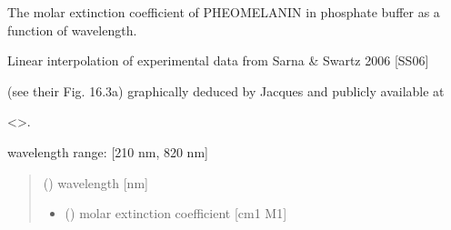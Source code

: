 \documentclass[letterpaper,10pt,english]{sphinxmanual}
\begin{document}
\begin{fulllineitems}
\label{\detokenize{03_absorption_coefficient:skinoptics.absorption_coefficient.molarext_phe_Sarna}}
\pysigstartsignatures
{}
\pysigstopsignatures
\begin{DUlineblock}{0em}
\item[] The molar extinction coefficient of PHEOMELANIN in phosphate buffer as a function of wavelength.
\item[] Linear interpolation of experimental data from Sarna \& Swartz 2006 {[}SS06{]}
\item[] (see their Fig. 16.3\sphinxhyphen{}a) graphically deduced by Jacques and publicly available at
\item[] \textless{}\textgreater{}.
\end{DUlineblock}

\begin{DUlineblock}{0em}
\item[] wavelength range: {[}210 nm, 820 nm{]}
\end{DUlineblock}
\begin{quote}\begin{description}
\sphinxAtStartPar
{} () \textendash{} wavelength {[}nm{]}

\sphinxAtStartPar
\begin{itemize}
\item {} 
\sphinxAtStartPar
{} () \textendash{} molar extinction coefficient {[}cm\sphinxhyphen{}1 M\sphinxhyphen{}1{]}

\end{itemize}


\end{description}\end{quote}

\end{fulllineitems}

\end{document}
